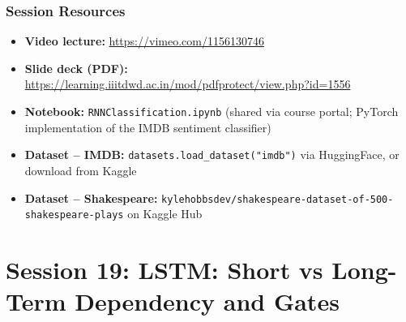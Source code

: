\documentclass[12pt,a4paper]{article}
\begin{document}
\newpage
\section*{Session Resources}

\begin{itemize}
  \item \textbf{Video lecture:}
        \url{https://vimeo.com/1156130746}
  \item \textbf{Slide deck (PDF):}
        \url{https://learning.iiitdwd.ac.in/mod/pdfprotect/view.php?id=1556}
  \item \textbf{Notebook:} \texttt{RNNClassification.ipynb}
        (shared via course portal; PyTorch implementation of the
        IMDB sentiment classifier)
  \item \textbf{Dataset -- IMDB:}
        \texttt{datasets.load\_dataset("imdb")} via HuggingFace, or
        download from Kaggle
  \item \textbf{Dataset -- Shakespeare:}
        \texttt{kylehobbsdev/shakespeare-dataset-of-500-shakespeare-plays}
        on Kaggle Hub
\end{itemize}

\clearpage

\part{Session 19: LSTM: Short vs Long-Term Dependency and Gates}
\end{document}
